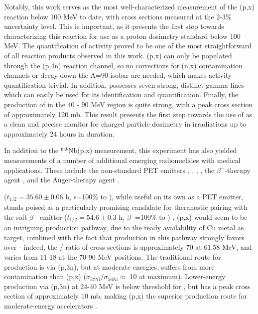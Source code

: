 \documentclass[3p]{elsarticle}
\begin{document}
Notably, this work serves as the most well-characterized measurement of the (p,x) reaction below 100 MeV to date, with cross sections measured  at the 2-3\% uncertainty level.
This is important, as it presents the first step towards characterizing this reaction for use as a proton dosimetry standard below 100 MeV.
The quantification of  activity proved to be one of the most straightforward of all reaction products observed in this work.
(p,x) can only be populated through the (p,4n) reaction channel, so no corrections for (n,x) contamination channels or decay down the A=90 isobar are needed, which makes activity quantification trivial.
In addition,   possesses seven strong, distinct gamma lines which can easily  be used for its identification and quantification.
Finally, the production of   in the 40 - 90 MeV region is quite strong, with a peak cross section of approximately 120 mb.
This result presents the first step towards the use of  as a clean and precise monitor for charged particle dosimetry in irradiations up to approximately 24 hours in duration.





In addition to the $^\text{nat}$Nb(p,x) measurement, this experiment has also yielded measurements of  a number of additional  emerging radionuclides with medical applications.
These include the non-standard PET emitters ,  , ,  , the $\beta^-$-therapy agent  ,  and the Auger-therapy agent . 



 ($t_{1/2}=35.60\pm0.06$ h, $\epsilon$=100\% to  \cite{Bhat1998}), while useful on its own as a PET emitter, stands poised as a particularly promising candidate for theranostic pairing with the soft $\beta^-$ emitter  ($t_{1/2}=54.6\pm0.3$ h, $\beta^-$=100\% to  \cite{Browne2010a}) \cite{PMID:7632762,zweit1996medium,Graves2016,Rosch2014}. 
(p,x) would seem to be an intriguing production pathway, due to the ready availability of Cu metal as target, combined with the fact that production in this pathway strongly favors  over  - indeed, the / ratio of cross sections is approximately 70 at 61.58 MeV, and varies from 11-18 at the 70-90 MeV positions.
The traditional route for  production is via (p,3n), but at moderate energies, suffers from more   contamination than (p,x)  ($\sigma_\text{57Ni} / \sigma_\text{56Ni}\approx$ 10 at maximum).
Lower-energy production via (p,3n) at 24-40 MeV is below threshold for , but has a peak cross section of approximately 10 mb, making (p,x) the superior production route for moderate-energy accelerators  \cite{MICHEL1997153,Ditrói2013}.
\end{document}
